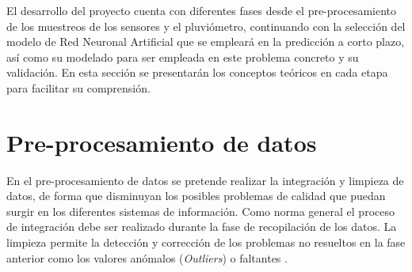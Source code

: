 El desarrollo del proyecto cuenta con diferentes fases desde el pre-procesamiento de los muestreos de los sensores y el pluviómetro,
continuando con la selección del modelo de Red Neuronal Artificial que se empleará en la predicción a corto plazo, así como su 
modelado para ser empleada en este problema concreto y su validación.
En esta sección se presentarán los conceptos teóricos en cada etapa para facilitar su comprensión.

\section{Pre-procesamiento de datos}
En el pre-procesamiento de datos se pretende realizar la integración y limpieza de datos, de forma que disminuyan los posibles problemas
de calidad que puedan surgir en los diferentes sistemas de información.
Como norma general el proceso de integración debe ser realizado durante la fase de recopilación de los datos.
La limpieza permite la detección y corrección de los problemas no resueltos en la fase anterior como los valores anómalos (\textit{Outliers}) o faltantes 
\cite{book:hernandez2004}.  


